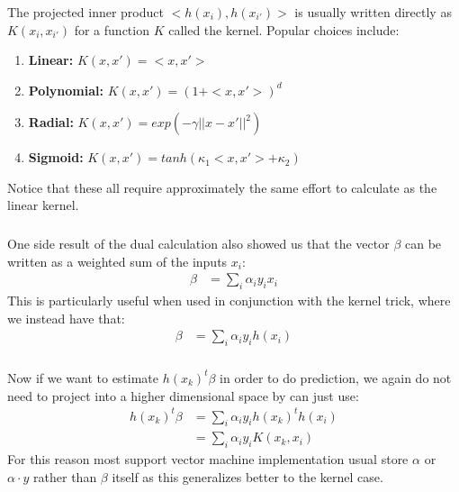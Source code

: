 \documentclass[xetex,mathserif,serif,aspectratio=169]{beamer}
\begin{document}
\begin{frame}[fragile] \frametitle{} \oldB \small

\textbf{}

The projected inner product $< h(x_i), h(x_{i'})>$ is usually
written directly as $K(x_i, x_{i'})$ for a function $K$ called
the kernel. Popular choices include:
\begin{enumerate}
\item \textbf{Linear:} $K(x, x') = <x, x'>$
\item \textbf{Polynomial:} $K(x, x') = (1 + <x, x'>)^d$
\item \textbf{Radial:}  $K(x, x') = exp(- \gamma || x - x' ||^2)$
\item \textbf{Sigmoid:}  $K(x, x') = tanh(\kappa_1 <x, x'> + \kappa_2)$
\end{enumerate}
Notice that these all require approximately the same effort to calculate as
the linear kernel.

\end{frame}

\begin{frame}[fragile] \frametitle{} \oldB \small

\textbf{}

One side result of the dual calculation also showed us that the
vector $\beta$ can be written as a weighted sum of the inputs $x_i$:
\begin{align*}
\beta &= \sum_i \alpha_i y_i x_i
\end{align*}
This is particularly useful when used in conjunction with the kernel
trick, where we instead have that:
\begin{align*}
\beta &= \sum_i \alpha_i y_i h(x_i)
\end{align*}

\end{frame}

\begin{frame}[fragile] \frametitle{} \oldB \small

\textbf{}

Now if we want to estimate $h(x_k)^t \beta$ in order to do prediction,
we again do not need to project into a higher dimensional space by
can just use:
\begin{align*}
h(x_k)^t \beta &= \sum_i \alpha_i y_i h(x_k)^t h(x_i) \\
&= \sum_i \alpha_i y_i K(x_k, x_i)
\end{align*}
For this reason most support vector machine implementation usual
store $\alpha$ or $\alpha \cdot y$ rather than $\beta$ itself
as this generalizes better to the kernel case.

\end{frame}
\end{document}
